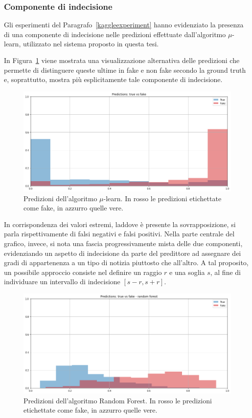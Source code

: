 \documentclass[12pt]{report}
\theoremstyle{definition}
\begin{document}
\subsubsection{Componente di indecisione}
Gli esperimenti del Paragrafo~\ref{kaggleexperiment} hanno evidenziato la presenza di una componente di indecisione nelle predizioni effettuate dall'algoritmo $\mu$-learn, utilizzato nel sistema proposto in questa tesi. 

In Figura~\ref{overlaypred} viene mostrata una visualizzazione alternativa delle predizioni che permette di distinguere queste ultime in fake e non fake secondo la ground truth e, soprattutto, mostra più esplicitamente tale componente di indecisione.
\begin{figure}
    \centering
    \includegraphics[scale=0.48]{images/experiment kaggle/overlaypred.png}
    \caption{Predizioni dell'algoritmo $\mu$-learn. In rosso le predizioni etichettate come fake, in azzurro quelle vere.}
    \label{overlaypred}
\end{figure}
In corrispondenza dei valori estremi, laddove è presente la sovrapposizione, si parla rispettivamente di falsi negativi e falsi positivi. Nella parte centrale del grafico, invece, si nota una fascia progressivamente mista delle due componenti, evidenziando un aspetto di indecisione da parte del predittore ad assegnare dei gradi di appartenenza a un tipo di notizia piuttosto che all'altro.
A tal proposito, un possibile approccio consiste nel definire un raggio $r$ e una soglia $s$, al fine di individuare un intervallo di indecisione $[s-r,s+r]$.
\begin{figure}
    \centering
    \includegraphics[scale=0.48]{images/experiment kaggle/indecisionrf.png}
    \caption{Predizioni dell'algoritmo Random Forest. In rosso le predizioni etichettate come fake, in azzurro quelle vere.}
    \label{indecisionrf}
\end{figure}
\end{document}
